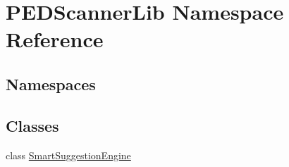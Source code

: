 \hypertarget{namespace_p_e_d_scanner_lib}{}\section{P\+E\+D\+Scanner\+Lib Namespace Reference}
\label{namespace_p_e_d_scanner_lib}
\subsection*{Namespaces}
\begin{DoxyCompactItemize}
\end{DoxyCompactItemize}
\subsection*{Classes}
\begin{DoxyCompactItemize}
\item 
class \mbox{\hyperlink{class_p_e_d_scanner_lib_1_1_smart_suggestion_engine}{Smart\+Suggestion\+Engine}}
\end{DoxyCompactItemize}
